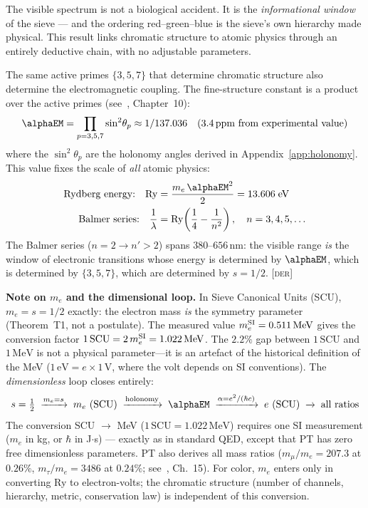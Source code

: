 \documentclass[12pt,a4paper]{article}
\begin{document}
The visible spectrum is not a biological accident. It is the
\emph{informational window} of the sieve --- and the ordering
red--green--blue is the sieve's own hierarchy made physical. This
result links chromatic structure to atomic physics through an entirely
deductive chain, with no adjustable parameters.

\begin{derivedbox}
The same active primes $\{3, 5, 7\}$ that determine chromatic
structure also determine the electromagnetic coupling. The
fine-structure constant is a product over the active primes
(see~\cite{senez2026math}, Chapter~10):
\begin{equation}
  \alphaEM = \prod_{p=3,5,7} \sin^2\!\theta_p
  \approx 1/137.036
  \quad\text{(3.4\,ppm from experimental value)}
  \label{eq:alpha}
\end{equation}
where the $\sin^2\!\theta_p$ are the holonomy angles derived in
Appendix~\ref{app:holonomy}. This value fixes the scale of
\emph{all} atomic physics:
\begin{align}
  \text{Rydberg energy:} \quad
  \mathrm{Ry} &= \frac{m_e\,\alphaEM^2}{2} = 13.606\;\mathrm{eV}
  \label{eq:rydberg} \\
  \text{Balmer series:} \quad
  \frac{1}{\lambda} &= \mathrm{Ry}\!\left(\frac{1}{4} - \frac{1}{n^2}\right),
  \quad n = 3, 4, 5, \ldots
  \label{eq:balmer}
\end{align}
The Balmer series ($n = 2 \to n' > 2$) spans $380$--$656\,\mathrm{nm}$:
the visible range \emph{is} the window of electronic transitions
whose energy is determined by $\alphaEM$, which is determined by
$\{3, 5, 7\}$, which are determined by $s = 1/2$. \textsc{[der]}

\medskip\noindent
\textbf{Note on $m_e$ and the dimensional loop.}\quad
In Sieve Canonical Units (SCU), $m_e = s = 1/2$ exactly: the electron
mass \emph{is} the symmetry parameter (Theorem~T1, not a postulate).
The measured value $m_e^{\rm SI} = 0.511\,\mathrm{MeV}$ gives the
conversion factor
$1\,\mathrm{SCU} = 2\,m_e^{\rm SI} = 1.022\,\mathrm{MeV}$.
The $2.2\%$ gap between $1\,\mathrm{SCU}$ and $1\,\mathrm{MeV}$ is
not a physical parameter---it is an artefact of the historical
definition of the MeV ($1\,\mathrm{eV} = e \times 1\,\mathrm{V}$,
where the volt depends on SI conventions). The \emph{dimensionless} loop closes entirely:
\[
  s = \tfrac{1}{2}
  \;\xrightarrow{m_e = s}\;
  m_e \text{ (SCU)}
  \;\xrightarrow{\text{holonomy}}\;
  \alphaEM
  \;\xrightarrow{\alpha = e^2/(\hbar c)}\;
  e \text{ (SCU)}
  \;\xrightarrow{}\;
  \text{all ratios}
\]
The conversion SCU $\to$ MeV
($1\,\mathrm{SCU} = 1.022\,\mathrm{MeV}$) requires one SI
measurement ($m_e$ in kg, or $\hbar$ in J$\cdot$s) --- exactly as in
standard QED, except that PT has zero free dimensionless parameters.
PT also derives all mass ratios ($m_\mu/m_e = 207.3$ at $0.26\%$,
$m_\tau/m_e = 3486$ at $0.24\%$;
see~\cite{senez2026math}, Ch.~15). For color, $m_e$ enters only in
converting Ry to electron-volts; the chromatic structure (number of
channels, hierarchy, metric, conservation law) is independent of this
conversion.
\end{derivedbox}
\end{document}
